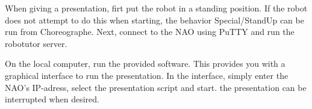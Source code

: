 When giving a presentation, firt put the robot in a standing position. If the robot does not attempt to do this when starting, the behavior Special/StandUp can be run from Choreographe.
Next, connect to the NAO using PuTTY and run the robotutor server.

On the local computer, run the provided software. This provides you with a graphical interface to run the presentation. In the interface, simply enter the NAO's IP-adress, select the presentation script and start. the presentation can be interrupted when desired.